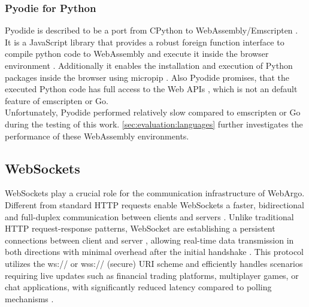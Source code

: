 \subsubsection{Pyodie for Python}
\label{subsec:methodology:wasm:python}
Pyodide is described to be a port from CPython to WebAssembly/Emscripten \cite{methodology:pyodie}. It is a JavaScript library that provides a robust foreign function interface to compile python code to WebAssembly and execute it inside the browser environment \cite{methodology:pyodie}. Additionally it enables the installation and execution of Python packages inside the browser using micropip \cite{methodology:pyodie}. Also Pyodide promises, that the executed Python code has full access to the Web \ac{API}s \cite{methodology:pyodie}, which is not an default feature of emscripten or Go.
~\\
Unfortunately, Pyodide performed relatively slow compared to emscripten or Go during the testing of this work. \autoref{sec:evaluation:languages} further investigates the performance of these WebAssembly environments. 

\subsection{WebSockets}
\label{sec:methodology:websockets}
WebSockets play a crucial role for the communication infrastructure of WebArgo. Different from standard \acs{HTTP} requests enable WebSockets a faster, bidirectional and full-duplex communication between clients and servers \cite{methodology:websockets1, methodology:websockets3, methodology:websockets2}. Unlike traditional \acs{HTTP} request-response patterns, WebSocket are establishing a persistent connections between client and server \cite{methodology:websockets3}, allowing real-time data transmission in both directions with minimal overhead after the initial handshake \cite{methodology:websockets3}. This protocol utilizes the ws:// or wss:// (secure) \ac{URI} scheme and efficiently handles scenarios requiring live updates such as financial trading platforms, multiplayer games, or chat applications, with significantly reduced latency compared to polling mechanisms \cite{methodology:websockets3}.

